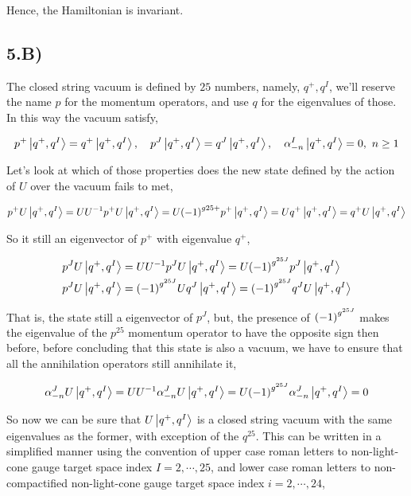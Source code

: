 Hence, the Hamiltonian is invariant.

\subsection{5.B)}

The closed string vacuum is defined by $25$ numbers, namely, $q^+,q^I$, we'll reserve the name $p$ for the momentum operators, and use $q$ 
for the eigenvalues of those. In this way the vacuum satisfy,

\begin{align*}
    p^+\ket{q^+,q^I}=q^+\ket{q^+,q^I},\ \ \ p^J\ket{q^+,q^I}=q^J\ket{q^+,q^I},\ \ \ \alpha_{-n}^I\ket{q^+,q^I}=0,\ n\geq 1
\end{align*}

Let's look at which of those properties does the new state defined by the action of $U$ over the vacuum fails to met,

\begin{align*}
    p^+U\ket{q^+,q^I}=UU^{-1}p^+U\ket{q^+,q^I}=U\qty(-1)^{g25+}p^+\ket{q^+,q^I}=Uq^+\ket{q^+,q^I}=q^+U\ket{q^+,q^I}
\end{align*}

So it still an eigenvector of $p^+$ with eigenvalue $q^+$,

\begin{align*}
    p^JU\ket{q^+,q^I}&=UU^{-1}p^JU\ket{q^+,q^I}=U\qty(-1)^{g^{25J}}p^J\ket{q^+,q^I}\\
    p^JU\ket{q^+,q^I}&=\qty(-1)^{g^{25J}}Uq^J\ket{q^+,q^I}=\qty(-1)^{g^{25J}}q^JU\ket{q^+,q^I}
\end{align*}

That is, the state still a eigenvector of $p^J$, but, the presence of $\qty(-1)^{g^{25J}}$ makes the eigenvalue of the $p^{25}$ momentum operator to 
have the opposite sign then before, before concluding that this state is also a vacuum, we have to ensure that all the annihilation operators 
still annihilate it,

\begin{align*}
    \alpha_{-n}^JU\ket{q^+,q^I}=UU^{-1}\alpha_{-n}^JU\ket{q^+,q^I}=U\qty(-1)^{g^{25J}}\alpha_{-n}^J\ket{q^+,q^I}=0
\end{align*}

So now we can be sure that $U\ket{q^+,q^I}$ is a closed string vacuum with the same eigenvalues as the former, with exception of the $q^{25}$. This 
can be written in a simplified manner using the convention of upper case roman letters to non-light-cone gauge target space index $I=2,\cdots,25$, 
and lower case roman letters to non-compactified non-light-cone gauge target space index $i=2,\cdots,24$,

